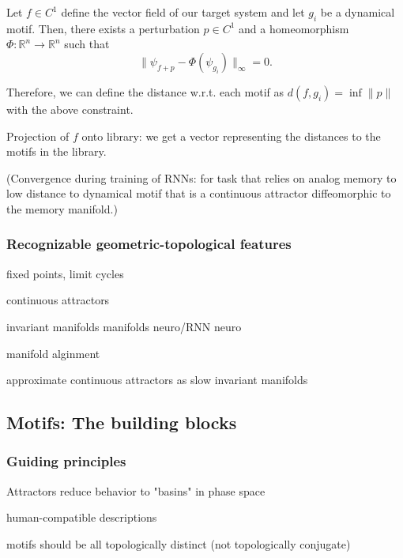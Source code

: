 \documentclass{article}
\newcommand{\ascomment}[1]{\textcolor{ascolor}{(#1)}}
\theoremstyle{definition} \newtheorem{definition}{Definition}  \newtheorem{example}{Example}
\theoremstyle{remark} \newtheorem{remark}{Remark}
\newcommand{\reals}{\mathbb{R}}
\newcounter{ct}
\begin{document}
Let $f\in C^1$ define the vector field of our target system
and let $g_i$ be a dynamical motif.
Then, there exists a perturbation $p\in C^1$ 
 and a homeomorphism $\Phi:\reals^n\rightarrow\reals^n$ such that 
\begin{equation}\label{eq:perfect_motif_fit}
\|\psi_{f+p} - \Phi(\psi_{g_i})\|_\infty = 0.
\end{equation}

Therefore, we can define the distance w.r.t. each motif as $d(f,g_i) = \inf \|p\|$ with the above constraint.

Projection of $f$ onto library: we get a vector representing the distances to the motifs in the library.

\ascomment{Convergence during training of RNNs: for task that relies on analog memory to low distance to dynamical motif that is a continuous attractor diffeomorphic to the memory manifold.}



\subsubsection{Recognizable geometric-topological features}
fixed points, limit cycles

continuous attractors

invariant manifolds
manifolds neuro/RNN\citep{langdon2023unifying, can2021emergence,
cueva2021continuous,
gort2024emergence,
mishra2021continual,
chaudhuri2019attractor, ghazizadeh2021slowmanifold, duncker2021dynamics, pezon2024linking}
neuro \citep{fortunato2024nonlinear}

manifold alginment \citep{kuoch2024probing}

approximate continuous attractors as slow invariant manifolds\citep{Sagodi2024a}


\subsection{Motifs: The building blocks}
\subsubsection{Guiding principles}
Attractors reduce behavior to "basins" in phase space

human-compatible descriptions

motifs should be all topologically distinct (not topologically conjugate)

\end{document}
